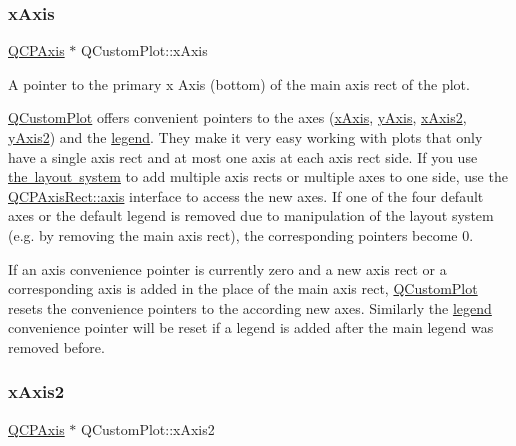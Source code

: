 \subsubsection{\texorpdfstring{x\+Axis}{xAxis}}
{\footnotesize\ttfamily \mbox{\hyperlink{class_q_c_p_axis}{Q\+C\+P\+Axis}} $\ast$ Q\+Custom\+Plot\+::x\+Axis}

A pointer to the primary x Axis (bottom) of the main axis rect of the plot.

\mbox{\hyperlink{class_q_custom_plot}{Q\+Custom\+Plot}} offers convenient pointers to the axes (\mbox{\hyperlink{class_q_custom_plot_a9a79cd0158a4c7f30cbc702f0fd800e4}{x\+Axis}}, \mbox{\hyperlink{class_q_custom_plot_af6fea5679725b152c14facd920b19367}{y\+Axis}}, \mbox{\hyperlink{class_q_custom_plot_ada41599f22cad901c030f3dcbdd82fd9}{x\+Axis2}}, \mbox{\hyperlink{class_q_custom_plot_af13fdc5bce7d0fabd640f13ba805c0b7}{y\+Axis2}}) and the \mbox{\hyperlink{class_q_custom_plot_a4eadcd237dc6a09938b68b16877fa6af}{legend}}. They make it very easy working with plots that only have a single axis rect and at most one axis at each axis rect side. If you use \mbox{\hyperlink{}{the layout system}} to add multiple axis rects or multiple axes to one side, use the \mbox{\hyperlink{class_q_c_p_axis_rect_a583ae4f6d78b601b732183f6cabecbe1}{Q\+C\+P\+Axis\+Rect\+::axis}} interface to access the new axes. If one of the four default axes or the default legend is removed due to manipulation of the layout system (e.\+g. by removing the main axis rect), the corresponding pointers become 0.

If an axis convenience pointer is currently zero and a new axis rect or a corresponding axis is added in the place of the main axis rect, \mbox{\hyperlink{class_q_custom_plot}{Q\+Custom\+Plot}} resets the convenience pointers to the according new axes. Similarly the \mbox{\hyperlink{class_q_custom_plot_a4eadcd237dc6a09938b68b16877fa6af}{legend}} convenience pointer will be reset if a legend is added after the main legend was removed before. \mbox{\label{class_q_custom_plot_ada41599f22cad901c030f3dcbdd82fd9}} 
\subsubsection{\texorpdfstring{x\+Axis2}{xAxis2}}
{\footnotesize\ttfamily \mbox{\hyperlink{class_q_c_p_axis}{Q\+C\+P\+Axis}} $\ast$ Q\+Custom\+Plot\+::x\+Axis2}

